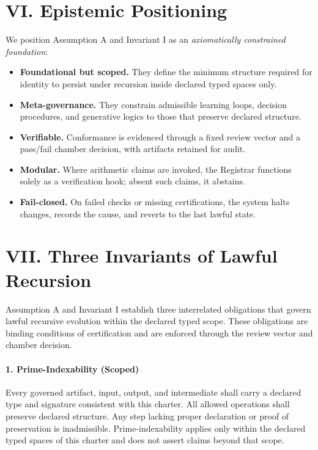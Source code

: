 \documentclass[12pt]{amsart}
\theoremstyle{plain}
\begin{document}
\section*{VI. Epistemic Positioning}

We position Assumption A and Invariant I as an \emph{axiomatically constrained foundation}:

\begin{itemize}
\item \textbf{Foundational but scoped.} They define the minimum structure required for identity to persist under recursion inside declared typed spaces only.
\item \textbf{Meta-governance.} They constrain admissible learning loops, decision procedures, and generative logics to those that preserve declared structure.
\item \textbf{Verifiable.} Conformance is evidenced through a fixed review vector and a pass/fail chamber decision, with artifacts retained for audit.
\item \textbf{Modular.} Where arithmetic claims are invoked, the Registrar functions solely as a verification hook; absent such claims, it abstains.
\item \textbf{Fail-closed.} On failed checks or missing certifications, the system halts changes, records the cause, and reverts to the last lawful state.
\end{itemize}

\section*{VII. Three Invariants of Lawful Recursion}

Assumption A and Invariant I establish three interrelated obligations that govern lawful recursive evolution within the declared typed scope. These obligations are binding conditions of certification and are enforced through the review vector and chamber decision.
\\
\paragraph{1. Prime-Indexability (Scoped)}
Every governed artifact, input, output, and intermediate shall carry a declared type and signature consistent with this charter. All allowed operations shall preserve declared structure. Any step lacking proper declaration or proof of preservation is inadmissible. Prime-indexability applies only within the declared typed spaces of this charter and does not assert claims beyond that scope.
\\
\end{document}

